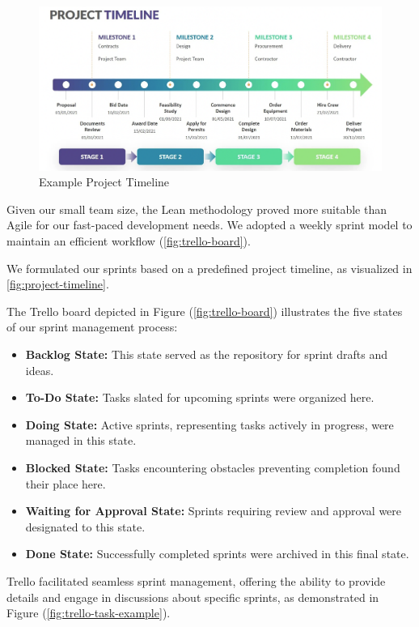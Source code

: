 \documentclass[12pt,a4paper]{article}
\begin{document}
\begin{spacing}{1.5}
    \begin{figure}[H]
        \centering
        \includegraphics[width=0.3\linewidth]{assets/project-timeline-example.png}
        \caption{Example Project Timeline}
        \label{fig:project-timeline}
    \end{figure}
    \FloatBarrier

    Given our small team size, the Lean methodology proved more suitable than Agile
    for our fast-paced development needs. We adopted a weekly sprint model to
    maintain an efficient workflow (\autoref{fig:trello-board}).

    We formulated our sprints based on a predefined project timeline, as visualized
    in \autoref{fig:project-timeline}.

    The Trello board depicted in Figure (\autoref{fig:trello-board}) illustrates
    the five states of our sprint management process:
    \begin{itemize}
        \item \textbf{Backlog State:}
              This state served as the repository for sprint drafts and ideas.

        \item \textbf{To-Do State:}
              Tasks slated for upcoming sprints were organized here.

        \item \textbf{Doing State:}
              Active sprints, representing tasks actively in progress, were managed in this state.

        \item \textbf{Blocked State:}
              Tasks encountering obstacles preventing completion found their place here.

        \item \textbf{Waiting for Approval State:}
              Sprints requiring review and approval were designated to this state.

        \item \textbf{Done State:}
              Successfully completed sprints were archived in this final state.

    \end{itemize}

    Trello facilitated seamless sprint management, offering the ability to provide
    details and engage in discussions about specific sprints, as demonstrated in
    Figure (\ref{fig:trello-task-example}).


\end{spacing}
\end{document}
